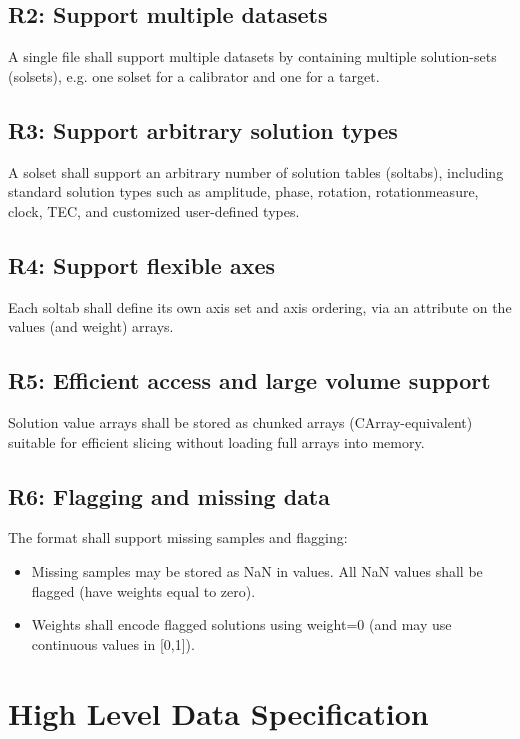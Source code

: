 \documentclass[a4paper,10pt,bibtotoc]{scrartcl}
\begin{document}
\subsection*{R2: Support multiple datasets}
A single file shall support multiple datasets by containing multiple solution-sets (solsets),
e.g. one solset for a calibrator and one for a target. 

\subsection*{R3: Support arbitrary solution types}
A solset shall support an arbitrary number of solution tables (soltabs), including standard
solution types such as amplitude, phase, rotation, rotationmeasure, clock, TEC, and customized user-defined
types. 

\subsection*{R4: Support flexible axes}
Each soltab shall define its own axis set and axis ordering, via an attribute on the values
(and weight) arrays. 

\subsection*{R5: Efficient access and large volume support}
Solution value arrays shall be stored as chunked arrays (CArray-equivalent) suitable for
efficient slicing without loading full arrays into memory. 

\subsection*{R6: Flagging and missing data}
The format shall support missing samples and flagging:
\begin{itemize}
  \item Missing samples may be stored as NaN in values. All NaN values shall be flagged (have weights equal to zero). 
  \item Weights shall encode flagged solutions using weight=0 (and may use continuous values in [0,1]). 
\end{itemize}


\section{High Level Data Specification}
\label{sec:structure}
\end{document}
